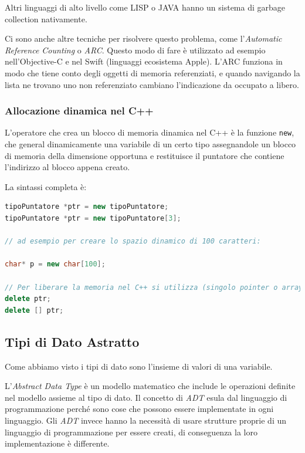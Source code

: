 \documentclass[
  paper=a4,
  oneside  ,captions=tableheading
]{scrbook}
\newcommand{\passthrough}[1]{#1}
\begin{document}
Altri linguaggi di alto livello come LISP o JAVA hanno un sistema di
garbage collection nativamente.

Ci sono anche altre tecniche per risolvere questo problema, come
l'\emph{Automatic Reference Counting} o \emph{ARC}. Questo modo di fare
è utilizzato ad esempio nell'Objective-C e nel Swift (linguaggi
ecosistema Apple). L'ARC funziona in modo che tiene conto degli oggetti
di memoria referenziati, e quando navigando la lista ne trovano uno non
referenziato cambiano l'indicazione da occupato a libero.

\hypertarget{allocazione-dinamica-nel-c}{%
\subsubsection{Allocazione dinamica nel
C++}\label{allocazione-dinamica-nel-c}}

L'operatore che crea un blocco di memoria dinamica nel C++ è la funzione
\passthrough{\lstinline!new!}, che general dinamicamente una variabile
di un certo tipo assegnandole un blocco di memoria della dimensione
opportuna e restituisce il puntatore che contiene l'indirizzo al blocco
appena creato.

La sintassi completa è:

\begin{lstlisting}[language={C++}]
tipoPuntatore *ptr = new tipoPuntatore;
tipoPuntatore *ptr = new tipoPuntatore[3];

// ad esempio per creare lo spazio dinamico di 100 caratteri:

char* p = new char[100];

// Per liberare la memoria nel C++ si utilizza (singolo pointer o array di elementi)
delete ptr;
delete [] ptr; 
\end{lstlisting}

\hypertarget{tipi-di-dato-astratto}{%
\subsection{Tipi di Dato Astratto}\label{tipi-di-dato-astratto}}

Come abbiamo visto i tipi di dato sono l'insieme di valori di una
variabile.

L'\emph{Abstract Data Type} è un modello matematico che include le
operazioni definite nel modello assieme al tipo di dato. Il concetto di
\emph{ADT} esula dal linguaggio di programmazione perché sono cose che
possono essere implementate in ogni linguaggio. Gli \emph{ADT} invece
hanno la necessità di usare strutture proprie di un linguaggio di
programmazione per essere creati, di conseguenza la loro implementazione
è differente.
\end{document}
